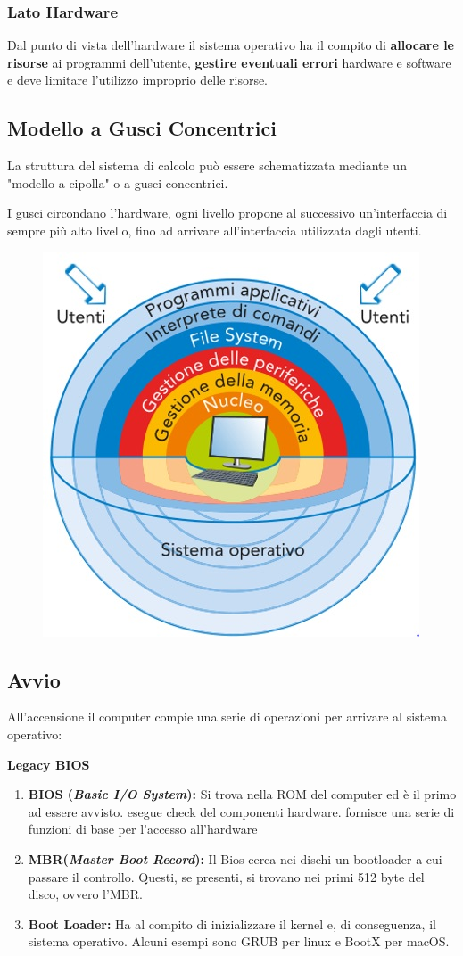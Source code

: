 \subsubsection*{Lato Hardware}
Dal punto di vista dell'hardware il sistema operativo ha il compito di \textbf{allocare le risorse} ai programmi dell'utente, \textbf{gestire eventuali errori} hardware e software e deve limitare l'utilizzo improprio delle risorse.

\subsection{Modello a Gusci Concentrici}
La struttura del sistema di calcolo può essere schematizzata mediante un "modello a cipolla" o a gusci concentrici.

I gusci circondano l'hardware, ogni livello propone al successivo un'interfaccia di sempre più alto livello, fino ad arrivare all'interfaccia utilizzata dagli utenti.

\begin{figure}[H]
    \centering
    \includegraphics[width=0.35\linewidth]{assets/modello-gusci-concentrici.jpeg}
\end{figure}

\subsection{Avvio}
All'accensione il computer compie una serie di operazioni per arrivare al sistema operativo:

\begin{note}
    \textbf{Legacy BIOS}
    \begin{enumerate}
        \item \textbf{BIOS (\textit{Basic I/O System}):}
              Si trova nella ROM del computer ed è il primo ad essere avvisto.
              esegue check del componenti hardware.
              fornisce una serie di funzioni di base per l'accesso all'hardware
        \item \textbf{MBR(\textit{Master Boot Record}):}
              Il Bios cerca nei dischi un bootloader a cui passare il controllo.
              Questi, se presenti, si trovano nei primi 512 byte del disco, ovvero l'MBR.
        \item \textbf{Boot Loader:}
              Ha al compito di inizializzare il kernel e, di conseguenza, il sistema operativo. Alcuni esempi sono GRUB per linux e BootX per macOS.
    \end{enumerate}
\end{note}

